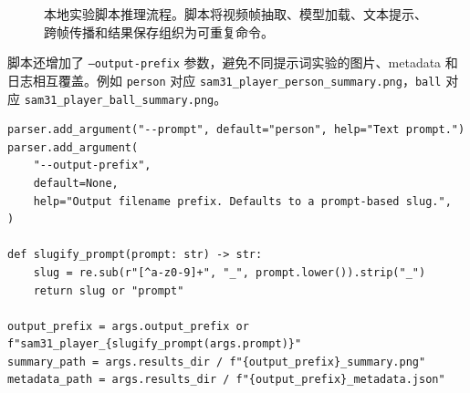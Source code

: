 \documentclass[UTF8,a4paper,zihao=-4,fontset=none]{ctexart}
\begin{document}
\begin{figure}[H]
  \centering
  \caption{本地实验脚本推理流程。脚本将视频帧抽取、模型加载、文本提示、跨帧传播和结果保存组织为可重复命令。}
  \label{fig:pipeline}
\end{figure}

脚本还增加了 \texttt{--output-prefix} 参数，避免不同提示词实验的图片、metadata 和日志相互覆盖。例如 \texttt{person} 对应 \texttt{sam31\_player\_person\_summary.png}，\texttt{ball} 对应 \texttt{sam31\_player\_ball\_summary.png}。

\begin{lstlisting}[style=pythoncode,caption={多提示词输出命名逻辑}]
parser.add_argument("--prompt", default="person", help="Text prompt.")
parser.add_argument(
    "--output-prefix",
    default=None,
    help="Output filename prefix. Defaults to a prompt-based slug.",
)

def slugify_prompt(prompt: str) -> str:
    slug = re.sub(r"[^a-z0-9]+", "_", prompt.lower()).strip("_")
    return slug or "prompt"

output_prefix = args.output_prefix or f"sam31_player_{slugify_prompt(args.prompt)}"
summary_path = args.results_dir / f"{output_prefix}_summary.png"
metadata_path = args.results_dir / f"{output_prefix}_metadata.json"
\end{lstlisting}
\end{document}
